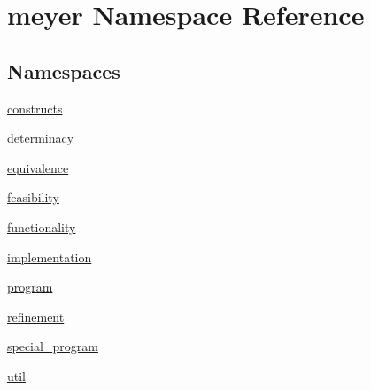 \hypertarget{namespacemeyer}{}\section{meyer Namespace Reference}
\label{namespacemeyer}
\subsection*{Namespaces}
\begin{DoxyCompactItemize}
\item 
 \hyperlink{namespacemeyer_1_1constructs}{constructs}
\item 
 \hyperlink{namespacemeyer_1_1determinacy}{determinacy}
\item 
 \hyperlink{namespacemeyer_1_1equivalence}{equivalence}
\item 
 \hyperlink{namespacemeyer_1_1feasibility}{feasibility}
\item 
 \hyperlink{namespacemeyer_1_1functionality}{functionality}
\item 
 \hyperlink{namespacemeyer_1_1implementation}{implementation}
\item 
 \hyperlink{namespacemeyer_1_1program}{program}
\item 
 \hyperlink{namespacemeyer_1_1refinement}{refinement}
\item 
 \hyperlink{namespacemeyer_1_1special__program}{special\+\_\+program}
\item 
 \hyperlink{namespacemeyer_1_1util}{util}
\end{DoxyCompactItemize}
